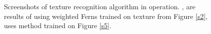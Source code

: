 \documentclass[10pt,twocolumn, a4paper]{article}
\begin{document}
\begin{figure}[t]
    \centering

 

    \caption{Screenshots of texture recognition algorithm in operation. \protect {} , \protect{} are results of using weighted Ferns trained on texture from Figure \protect \ref{s2}, \protect {} uses method trained on  Figure \protect \ref{s5}. }
    \label{screenshots}
\end{figure}
\end{document}
